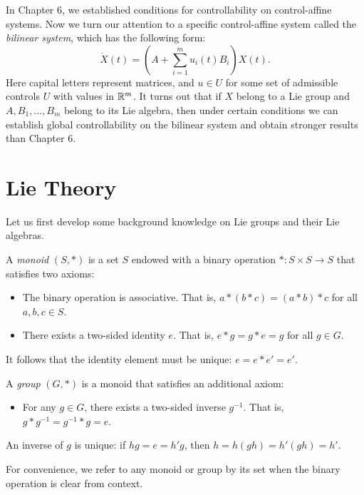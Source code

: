 \documentclass[12pt,class=article,crop=false]{standalone}
\begin{document}
In Chapter 6, we established conditions for controllability on control-affine systems. Now we turn our attention to a specific control-affine system called the \emph{bilinear system}, which has the following form:
\begin{equation} \label{eq:matrix_eq} 
	\dot{X}(t) = \left( A + \sum_{ i= 1}^{ m} u_i(t) B_i \right) X(t) .
\end{equation}
Here capital letters represent matrices, and $ u \in U$ for some set of admissible controls $ U$ with values in  $ \mathbb{R}^{m}$. It turns out that if $ X$ belong to a Lie group and $ A, B_1,\ldots,B_m$ belong to its Lie algebra, then under certain conditions we can establish global controllability on the bilinear system and obtain stronger results than Chapter 6.

\section{Lie Theory}
Let us first develop some background knowledge on Lie groups and their Lie algebras.
\begin{defn}
A \emph{monoid} $ (S,*)$ is a set $ S$ endowed with a binary operation  $ *: S \times S \to S$ that satisfies two axioms:
\begin{itemize}
	\item The binary operation is associative. That is, $ a*(b*c) = (a*b)*c$ for all  $ a,b,c \in S$.
	\item There exists a two-sided identity $ e$. That is, $ e*g=g*e=g$ for all  $ g \in G$.
\end{itemize}
\end{defn}
It follows that the identity element must be unique: $ e = e *e' = e'$.
\begin{defn}
A \emph{group} $ (G,*)$ is a monoid that satisfies an additional axiom:
\begin{itemize}
\item For any $g \in G $, there exists a two-sided inverse $ g^{-1}$. That is, $ g*g^{-1} = g^{-1}*g = e$.
\end{itemize}
\end{defn}
An inverse of $ g$ is unique: if $ hg = e = h'g$, then $ h = h(gh) = h'(gh) =h'$.

For convenience, we refer to any monoid or group by its set when the binary operation is clear from context. 
\end{document}
